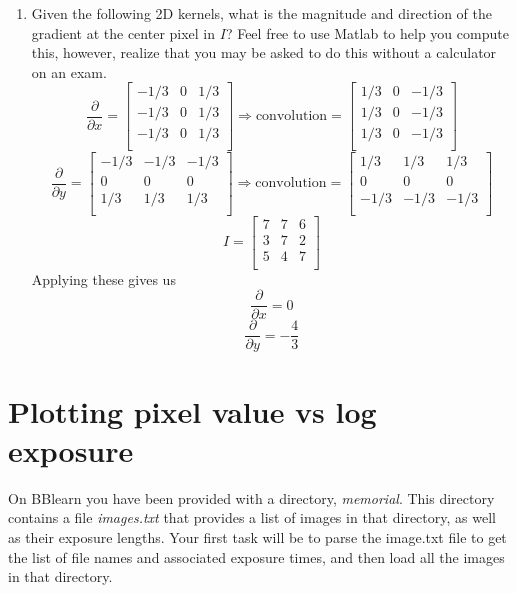 \documentclass{article}
\begin{document}
\begin{enumerate}
\item Given the following 2D kernels, what is the magnitude and direction of the gradient at the center pixel in $I$?  Feel free to use Matlab to help you compute this, however, realize that you may be asked to do this without a calculator on an exam.
\begin{equation}
\frac{\partial}{\partial x} = \begin{bmatrix}
-1/3 & 0 & 1/3\\
-1/3 & 0 & 1/3\\
-1/3 & 0 & 1/3\\
\end{bmatrix}
\Rightarrow
\text{convolution} = \begin{bmatrix}
1/3 & 0 & -1/3\\
1/3 & 0 & -1/3\\
1/3 & 0 & -1/3\\
\end{bmatrix}
\end{equation}
\begin{equation}
\frac{\partial}{\partial y} = \begin{bmatrix}
-1/3 & -1/3 & -1/3\\
0 & 0 & 0\\
1/3 & 1/3 & 1/3\\
\end{bmatrix}
\Rightarrow
\text{convolution} = \begin{bmatrix}
1/3 & 1/3 & 1/3\\
0 & 0 & 0\\
-1/3 & -1/3 & -1/3\\
\end{bmatrix}
\end{equation}
\begin{equation}
I=
\begin{bmatrix}
7 & 7 & 6\\
3 & 7 & 2\\
5 & 4 & 7\\
\end{bmatrix}
\end{equation}
Applying these gives us
$$ \frac{\partial}{\partial x} = 0 $$
$$ \frac{\partial}{\partial y} = -\frac{4}{3} $$

\end{enumerate}

\section{Plotting pixel value vs log exposure}
On BBlearn you have been provided with a directory, \emph{memorial}.  This directory contains a file \emph{images.txt} that provides a list of images in that directory, as well as their exposure lengths.  Your first task will be to parse the image.txt file to get the list of file names and associated exposure times, and then load all the images in that directory.\\
\end{document}
